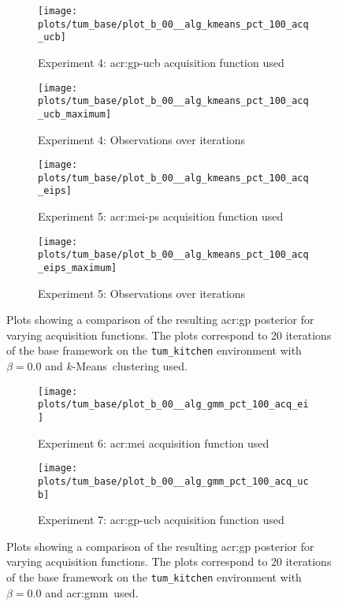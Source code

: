 \begin{figure}[t]
	\centering
	\captionsetup{font=small}
	\captionsetup[subfigure]{font=footnotesize}
	\captionsetup[subfigure]{justification=centering}
	\begin{subfigure}[t]{0.495\textwidth}
		\texttt{[image: plots/tum\_base/plot\_b\_00\_\_alg\_kmeans\_pct\_100\_acq\_ucb]}
		\caption{Experiment 4: \acrshort{acr:gp-ucb} acquisition function used}
		\label{fig:exp4}
	\end{subfigure}
	\begin{subfigure}[t]{0.495\textwidth}
		\texttt{[image: plots/tum\_base/plot\_b\_00\_\_alg\_kmeans\_pct\_100\_acq\_ucb\_maximum]}
		\caption{Experiment 4: Observations over iterations}
		\label{fig:exp4_observations}
	\end{subfigure}
	\begin{subfigure}[t]{0.495\textwidth}
		\texttt{[image: plots/tum\_base/plot\_b\_00\_\_alg\_kmeans\_pct\_100\_acq\_eips]}
		\caption{Experiment 5: \acrshort{acr:mei-ps} acquisition function used}
		\label{fig:exp5}
	\end{subfigure}
	\begin{subfigure}[t]{0.495\textwidth}
		\texttt{[image: plots/tum\_base/plot\_b\_00\_\_alg\_kmeans\_pct\_100\_acq\_eips\_maximum]}
		\caption{Experiment 5: Observations over iterations}
		\label{fig:exp5_observations}
	\end{subfigure}
	\caption{Plots showing a comparison of the resulting \acrshort{acr:gp} posterior for varying acquisition functions. The plots correspond to 20 iterations of the base framework on the \texttt{tum\_kitchen} environment with $\beta = 0.0$ and $k$-Means~clustering used.}
	\label{fig:plots_tum_base_acq}
\end{figure}

\begin{figure}[t!]
	\centering
	\captionsetup{font=small}
	\captionsetup[subfigure]{font=footnotesize}
	\captionsetup[subfigure]{justification=centering}
	\begin{subfigure}[t]{0.495\textwidth}
		\texttt{[image: plots/tum\_base/plot\_b\_00\_\_alg\_gmm\_pct\_100\_acq\_ei]}
		\caption{Experiment 6: \acrshort{acr:mei} acquisition function used}
		\label{fig:exp6}
	\end{subfigure}
	\begin{subfigure}[t]{0.495\textwidth}
		\texttt{[image: plots/tum\_base/plot\_b\_00\_\_alg\_gmm\_pct\_100\_acq\_ucb]}
		\caption{Experiment 7: \acrshort{acr:gp-ucb} acquisition function used}
		\label{fig:exp7}
	\end{subfigure}
	\caption{Plots showing a comparison of the resulting \acrshort{acr:gp} posterior for varying acquisition functions. The plots correspond to 20 iterations of the base framework on the \texttt{tum\_kitchen} environment with $\beta = 0.0$ and \acrshort{acr:gmm}~used.}
	\label{fig:plots_tum_base_gmm}
\end{figure}


